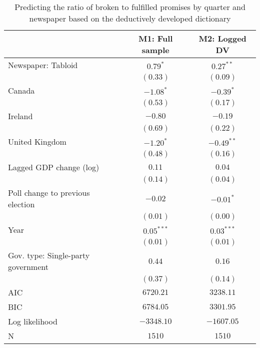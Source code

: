
\begin{table}[!h]
\caption{Predicting the ratio of broken to fulfilled promises by quarter and newspaper 
       based on the deductively developed dictionary}
\begin{center}
\begin{footnotesize}
\begin{tabular}{l c c}
\hline
 & M1: Full sample & M2: Logged DV \\
\hline
Newspaper: Tabloid                 & $0.79^{*}$   & $0.27^{**}$  \\
                                   & $(0.33)$     & $(0.09)$     \\
Canada                             & $-1.08^{*}$  & $-0.39^{*}$  \\
                                   & $(0.53)$     & $(0.17)$     \\
Ireland                            & $-0.80$      & $-0.19$      \\
                                   & $(0.69)$     & $(0.22)$     \\
United Kingdom                     & $-1.20^{*}$  & $-0.49^{**}$ \\
                                   & $(0.48)$     & $(0.16)$     \\
Lagged GDP change (log)            & $0.11$       & $0.04$       \\
                                   & $(0.14)$     & $(0.04)$     \\
Poll change to previous election   & $-0.02$      & $-0.01^{*}$  \\
                                   & $(0.01)$     & $(0.00)$     \\
Year                               & $0.05^{***}$ & $0.03^{***}$ \\
                                   & $(0.01)$     & $(0.01)$     \\
Gov. type: Single-party government & $0.44$       & $0.16$       \\
                                   & $(0.37)$     & $(0.14)$     \\
\hline
AIC                                & $6720.21$    & $3238.11$    \\
BIC                                & $6784.05$    & $3301.95$    \\
Log likelihood                     & $-3348.10$   & $-1607.05$   \\
N                                  & $1510$       & $1510$       \\

\end{tabular}
\end{footnotesize}
\end{center}
\end{table}
